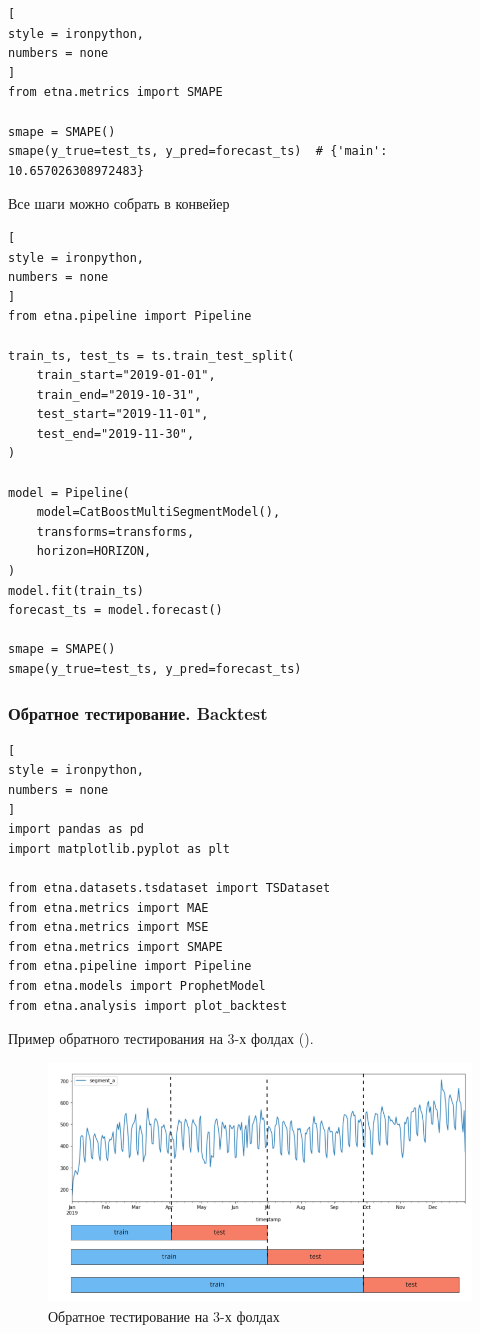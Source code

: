 \documentclass[%
	11pt,
	a4paper,
	utf8,
		]{article}
\begin{document}
\begin{lstlisting}[
style = ironpython,
numbers = none
]
from etna.metrics import SMAPE

smape = SMAPE()
smape(y_true=test_ts, y_pred=forecast_ts)  # {'main': 10.657026308972483}
\end{lstlisting}

Все шаги можно собрать в конвейер
\begin{lstlisting}[
style = ironpython,
numbers = none	
]
from etna.pipeline import Pipeline

train_ts, test_ts = ts.train_test_split(
	train_start="2019-01-01",
	train_end="2019-10-31",
	test_start="2019-11-01",
	test_end="2019-11-30",
)

model = Pipeline(
	model=CatBoostMultiSegmentModel(),
	transforms=transforms,
	horizon=HORIZON,
)
model.fit(train_ts)
forecast_ts = model.forecast()

smape = SMAPE()
smape(y_true=test_ts, y_pred=forecast_ts)
\end{lstlisting}

\subsubsection{Обратное тестирование. Backtest}

\begin{lstlisting}[
style = ironpython,
numbers = none
]
import pandas as pd
import matplotlib.pyplot as plt

from etna.datasets.tsdataset import TSDataset
from etna.metrics import MAE
from etna.metrics import MSE
from etna.metrics import SMAPE
from etna.pipeline import Pipeline
from etna.models import ProphetModel
from etna.analysis import plot_backtest
\end{lstlisting}

Пример обратного тестирования на 3-х фолдах ().

\begin{figure}[h]
	\centering
	\includegraphics[scale=1.0]{figures/backtest.png}
	\caption{ Обратное тестирование на 3-х фолдах }\label{fig:backtest}
\end{figure}
\end{document}
